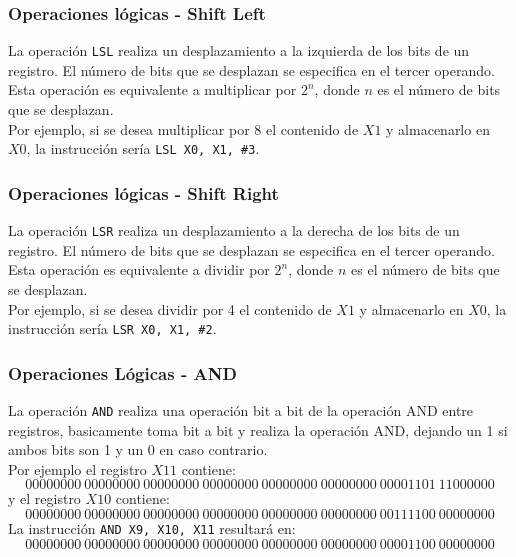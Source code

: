 \documentclass[aspectradio=43]{beamer}
\begin{document}
\begin{frame}
    \frametitle{Operaciones lógicas - Shift Left}
    La operación \texttt{LSL} realiza un desplazamiento a la izquierda de los bits de un registro. El número de bits que se desplazan se especifica en el tercer operando. Esta operación es equivalente a multiplicar por \(2^n\), donde \(n\) es el número de bits que se desplazan. \\
    Por ejemplo, si se desea multiplicar por 8 el contenido de \(X1\) y almacenarlo en \(X0\), la instrucción sería \texttt{LSL X0, X1, \#3}.
\end{frame}

\begin{frame}
    \frametitle{Operaciones lógicas - Shift Right}
    La operación \texttt{LSR} realiza un desplazamiento a la derecha de los bits de un registro. El número de bits que se desplazan se especifica en el tercer operando. Esta operación es equivalente a dividir por \(2^n\), donde \(n\) es el número de bits que se desplazan. \\
    Por ejemplo, si se desea dividir por 4 el contenido de \(X1\) y almacenarlo en \(X0\), la instrucción sería \texttt{LSR X0, X1, \#2}.
\end{frame}

\begin{frame}
    \frametitle{Operaciones Lógicas - AND}
    La operación \texttt{AND} realiza una operación bit a bit de la operación AND entre registros, basicamente toma bit a bit y realiza la operación AND, dejando un 1 si ambos bits son 1 y un 0 en caso contrario.\\
    Por ejemplo el registro \(X11\) contiene:
    \begin{equation*}
        \scriptstyle
        00000000\ 00000000\ 00000000\ 00000000\ 00000000\ 00000000\ 00001101\ 11000000
    \end{equation*}
    y el registro \(X10\) contiene:
    \begin{equation*}
        \scriptstyle
        00000000\ 00000000\ 00000000\ 00000000\ 00000000\ 00000000\ 00111100\ 00000000
    \end{equation*}
    La instrucción \texttt{AND X9, X10, X11} resultará en:
    \begin{equation*}
        \scriptstyle
        00000000\ 00000000\ 00000000\ 00000000\ 00000000\ 00000000\ 00001100\ 00000000
    \end{equation*}
\end{frame}
\end{document}
